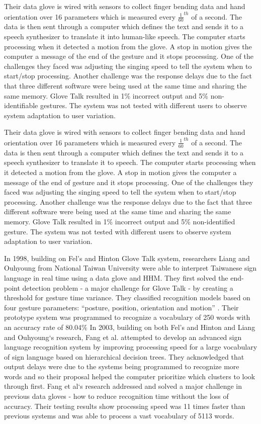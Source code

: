 Their data glove is wired with sensors to collect finger bending data and hand orientation over 16 parameters which is measured every $\frac{1}{60}^{th}$ of a second. The data is then sent through a computer which defines the text and sends it to a speech synthesizer to translate it into human-like speech. The computer starts processing when it detected a motion from the glove. A stop in motion gives the computer a message of the end of the gesture and it stops processing. One of the challenges they faced was adjusting the singing speed to tell the system when to start/stop processing. Another challenge was the response delays due to the fact that three different software were being used at the same time and sharing the same memory. Glove Talk resulted in 1\% incorrect output and 5\% non-identifiable gestures. The system was not tested with different users to observe system adaptation to user variation. 

Their data glove is wired with sensors to collect finger bending data and hand orientation over 16 parameters which is measured every $\frac{1}{60}^{th}$ of a second. The data is then sent through a computer which defines the text and sends it to a speech synthesizer to translate it to speech. The computer starts processing when it detected a motion from the glove. A stop in motion gives the computer a message of the end of gesture and it stops processing. One of the challenges they faced was adjusting the singing speed to tell the system when to start/stop processing. Another challenge was the response delays due to the fact that three different software were being used at the same time and sharing the same memory. Glove Talk resulted in 1\% incorrect output and 5\% non-identified gesture. The system was not tested with different users to observe system adaptation to user variation. 


In 1998, building on Fel’s and Hinton \parencite{Fels1993} Glove Talk system, researchers Liang and Ouhyoung \parencite{Liang1998} from National Taiwan University were able to interpret Taiwanese sign language in real time using a data glove and HHM. They first solved the end-point detection problem - a major challenge for Glove Talk - by creating a threshold for gesture time variance. They classified recognition models based on four gesture parameters: ``posture, position, orientation and motion'' \parencite{Liang1998}. Their prototype system was programmed to recognize a vocabulary of 250 words with an accuracy rate of 80.04\%
In 2003, building on both Fel’s and Hinton \parencite{Fels1993} and Liang and Ouhyoung‘s \parencite{Liang1998} research, Fang et al. \parencite{Fang2003} attempted to develop an advanced sign language recognition system by improving processing speed for a large vocabulary of sign language based on hierarchical decision trees. They acknowledged that output delays were due to the systems being programmed to recognize more words and so their proposal helped the computer prioritize which clusters to look through first. Fang et al‘s research addressed and solved a major challenge in previous data gloves - how to reduce recognition time without the loss of accuracy. Their testing results show processing speed was 11 times faster than previous systems and was able to process a vast vocabulary of 5113 words.


